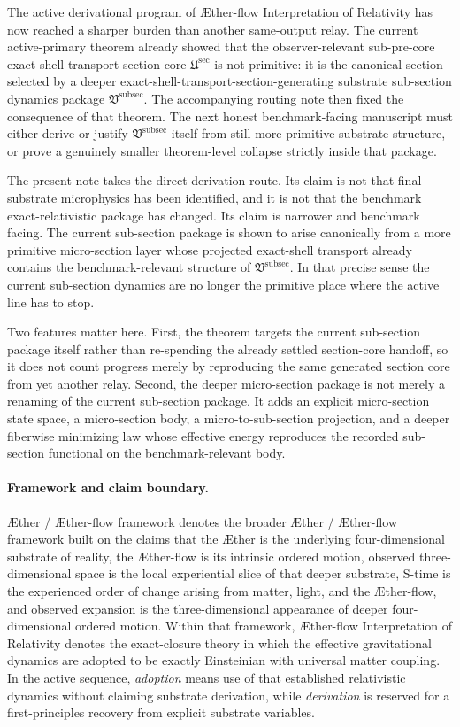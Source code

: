 \documentclass[11pt]{article}
\newcommand{\Aether}{\AE{}ther}
\newcommand{\Aflow}{\AE{}ther-flow}
\newcommand{\TheoryName}{\Aflow{} Interpretation of Relativity}
\newcommand{\TheoryProgram}{\Aether{} / \Aflow{} framework}
\newcommand{\SubPreSectionCore}{\mathfrak U^{\mathrm{sec}}}
\newcommand{\SubSectionPackage}{\mathfrak V^{\mathrm{subsec}}}
\begin{document}
The active derivational program of \TheoryName{} has now reached a sharper burden than another same-output relay. The current active-primary theorem already showed that the observer-relevant sub-pre-core exact-shell transport-section core \(\SubPreSectionCore\) is not primitive: it is the canonical section selected by a deeper exact-shell-transport-section-generating substrate sub-section dynamics package \(\SubSectionPackage\). The accompanying routing note then fixed the consequence of that theorem. The next honest benchmark-facing manuscript must either derive or justify \(\SubSectionPackage\) itself from still more primitive substrate structure, or prove a genuinely smaller theorem-level collapse strictly inside that package.

The present note takes the direct derivation route. Its claim is not that final substrate microphysics has been identified, and it is not that the benchmark exact-relativistic package has changed. Its claim is narrower and benchmark facing. The current sub-section package is shown to arise canonically from a more primitive micro-section layer whose projected exact-shell transport already contains the benchmark-relevant structure of \(\SubSectionPackage\). In that precise sense the current sub-section dynamics are no longer the primitive place where the active line has to stop.

Two features matter here. First, the theorem targets the current sub-section package itself rather than re-spending the already settled section-core handoff, so it does not count progress merely by reproducing the same generated section core from yet another relay. Second, the deeper micro-section package is not merely a renaming of the current sub-section package. It adds an explicit micro-section state space, a micro-section body, a micro-to-sub-section projection, and a deeper fiberwise minimizing law whose effective energy reproduces the recorded sub-section functional on the benchmark-relevant body.

\paragraph{Framework and claim boundary.}
\TheoryProgram{} denotes the broader \Aether{} / \Aflow{} framework built on the claims that the \Aether{} is the underlying four-dimensional substrate of reality, the \Aflow{} is its intrinsic ordered motion, observed three-dimensional space is the local experiential slice of that deeper substrate, S-time is the experienced order of change arising from matter, light, and the \Aflow{}, and observed expansion is the three-dimensional appearance of deeper four-dimensional ordered motion. Within that framework, \TheoryName{} denotes the exact-closure theory in which the effective gravitational dynamics are adopted to be exactly Einsteinian with universal matter coupling. In the active sequence, \emph{adoption} means use of that established relativistic dynamics without claiming substrate derivation, while \emph{derivation} is reserved for a first-principles recovery from explicit substrate variables.
\end{document}
